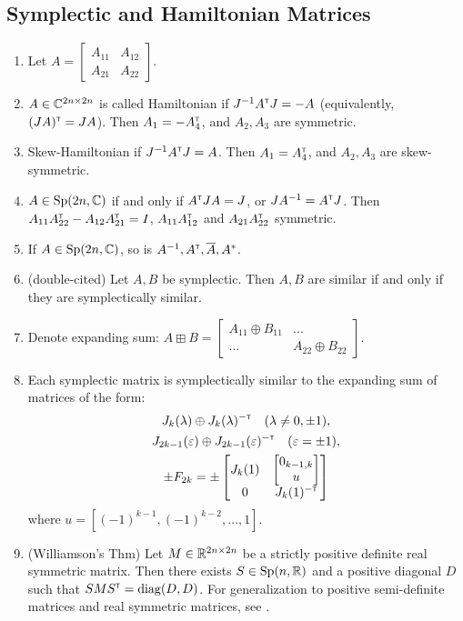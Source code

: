 \subsection{Symplectic and Hamiltonian Matrices}
\label{sec:symplectic-matrices}
\begin{enumerate}
    \item Let $A=\begin{bmatrix}
        A_{11} & A_{12} \\ A_{21} & A_{22}
    \end{bmatrix}$.
    \item $A \in \mathbb{C}^{2n\times 2n}$ is called Hamiltonian if $J^{-1}A^{\scriptscriptstyle\mathsf{T}} J=-A$ (equivalently, $(JA)^{\scriptscriptstyle\mathsf{T}}=JA$). Then $A_1=-A_4^{\scriptscriptstyle\mathsf{T}}$, and $A_2,A_3$ are symmetric. 
    \item Skew-Hamiltonian if $J^{-1}A^{\scriptscriptstyle\mathsf{T}} J=A$. Then $A_1=A_4^{\scriptscriptstyle\mathsf{T}}$, and $A_2,A_3$ are skew-symmetric. 
    \item \cite[Proposition~1]{dR15} $A\in \operatorname{Sp}(2n, \mathbb{C})$ if and only if $A^{\scriptscriptstyle\mathsf{T}} J A = J$, or $JA^{-1}=A^{\scriptscriptstyle\mathsf{T}} J$. Then $A_{11} A_{22}^{\scriptscriptstyle\mathsf{T}} - A_{12} A_{21}^{\scriptscriptstyle\mathsf{T}} = I$, $A_{11} A_{12}^{\scriptscriptstyle\mathsf{T}}$ and $A_{21} A_{22}^{\scriptscriptstyle\mathsf{T}}$ symmetric. 
    \item If $A \in \operatorname{Sp}(2n,\mathbb{C})$, so is $A^{-1}, A^{\scriptscriptstyle\mathsf{T}}, \overline{A}, A^*$.
    \item \cite[Lemma~3]{dR15} (double-cited) Let $A,B$ be symplectic. Then $A,B$ are similar if and only if they are symplectically similar.
    \item Denote expanding sum: $A \boxplus B=\begin{bmatrix}
        A_{11} \oplus B_{11} & ... \\ ... & A_{22} \oplus B_{22}
    \end{bmatrix}$.
    \item \cite[Lemma~5]{dR15} Each symplectic matrix is symplectically similar to the expanding sum of matrices of the form:
    \begin{gather*}
    J_k(\lambda) \oplus J_{k}(\lambda)^{-{\scriptscriptstyle\mathsf{T}}} \quad (\lambda \neq 0,\pm 1), \\
    J_{2k-1}(\varepsilon) \oplus J_{2k-1}(\varepsilon)^{-{\scriptscriptstyle\mathsf{T}}} \quad (\varepsilon=\pm 1), \\
    \pm F_{2k} = \pm \begin{bmatrix}
        J_k(1) & \begin{bmatrix} 0_{k-1,k} \\ u \end{bmatrix} \\
        0 & J_k(1)^{-{\scriptscriptstyle\mathsf{T}}}
    \end{bmatrix}
    \end{gather*}
    where $u=[(-1)^{k-1},(-1)^{k-2},\dots,1]$.
    \item (Williamson’s Thm) Let $M\in \mathbb{R}^{2n\times 2n}$ be a strictly positive definite real symmetric matrix. Then there exists $S \in \operatorname{Sp}(n,\mathbb{R})$ and a positive diagonal $D$ such that $SMS^{\scriptscriptstyle\mathsf{T}} = \operatorname{diag}(D, D)$. For generalization to positive semi-definite matrices and real symmetric matrices, see \cite{mishra2024williamson}.
\end{enumerate}


